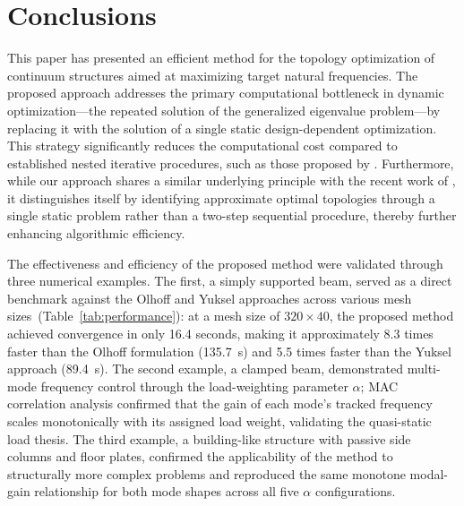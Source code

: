 \documentclass[pdflatex,lineno,sn-mathphys-ay]{sn-jnl}
\begin{document}
\section{Conclusions}

This paper has presented an efficient method for the topology optimization of continuum structures aimed at maximizing target natural frequencies. The proposed approach addresses the primary computational bottleneck in dynamic optimization—the repeated solution of the generalized eigenvalue problem—by replacing it with the solution of a single static design-dependent optimization. This strategy significantly reduces the computational cost compared to established nested iterative procedures, such as those proposed by \citet{Du2007}. Furthermore, while our approach shares a similar underlying principle with the recent work of \citet{Yuksel2025}, it distinguishes itself by identifying approximate optimal topologies through a single static problem rather than a two-step sequential procedure, thereby further enhancing algorithmic efficiency.

The effectiveness and efficiency of the proposed method were validated through three numerical examples. The first, a simply supported beam, served as a direct benchmark against the Olhoff and Yuksel approaches across various mesh sizes~(Table~\ref{tab:performance}): at a mesh size of $320 \times 40$, the proposed method achieved convergence in only 16.4 seconds, making it approximately 8.3 times faster than the Olhoff formulation (135.7~s) and 5.5 times faster than the Yuksel approach (89.4~s). The second example, a clamped beam, demonstrated multi-mode frequency control through the load-weighting parameter $\alpha$; MAC correlation analysis confirmed that the gain of each mode's tracked frequency scales monotonically with its assigned load weight, validating the quasi-static load thesis. The third example, a building-like structure with passive side columns and floor plates, confirmed the applicability of the method to structurally more complex problems and reproduced the same monotone modal-gain relationship for both mode shapes across all five $\alpha$ configurations.
\end{document}
